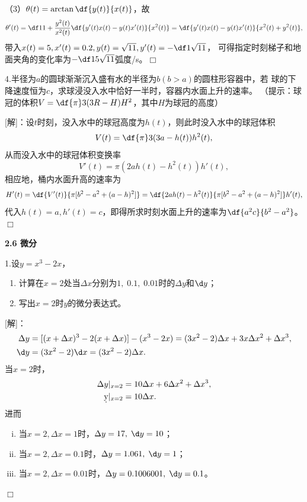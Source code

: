 （3）$\theta(t)=\arctan\df{y(t)}{x(t)}$，故
$$\theta'(t)=\df1{1+\frac{y^2(t)}{x^2(t)}}
\df{y'(t)x(t)-y(t)x'(t)}{x^2(t)}=\df{y'(t)x(t)-y(t)x'(t)}{x^2(t)+y^2(t)},$$
带入$x(t)=5,x'(t)=0.2,y(t)=\sqrt{11},y'(t)=-\df1{\sqrt{11}}$，
可得指定时刻梯子和地面夹角的变化率为$-\df1{5\sqrt{11}}$弧度/s。\hfill$\Box$

\bigskip

4.半径为$a$的圆球渐渐沉入盛有水的半径为$b(b>a)$的圆柱形容器中，若
球的下降速度恒为$c$，求球浸没入水中恰好一半时，容器内水面上升的速率。
（提示：球冠的体积$V=\df{\pi}3(3R-H)H^2$，其中$H$为球冠的高度）

[解]：设$t$时刻，没入水中的球冠高度为$h(t)$，则此时没入水中的球冠体积
$$V(t)=\df{\pi}3(3a-h(t))h^2(t),$$
从而没入水中的球冠体积变换率
$$V'(t)=\pi(2ah(t)-h^2(t))h'(t),$$
相应地，桶内水面升高的速率为
$$H'(t)=\df{V'(t)}{\pi [b^2-a^2+(a-h)^2]}
=\df{2ah(t)-h^2(t)}{\pi [b^2-a^2+(a-h)^2]}h'(t),$$
代入$h(t)=a,h'(t)=c$，即得所求时刻水面上升的速率为$\df{a^2c}{b^2-a^2}$。
\hfill$\Box$

\begin{center}
	\bf 2.6 微分
\end{center}

\bigskip

1.设$y=x^3-2x$，
\begin{enumerate}[(1)]
  \setlength{\itemindent}{1cm}
  \item 计算在$x=2$处当$\Delta x$分别为$1,\;0.1,\;
  0.01$时的$\Delta y$和$\d y$；
  \item 写出$x=2$时$y$的微分表达式。
\end{enumerate}

[解]：
\begin{align*}
	\Delta y&=[(x+\Delta x)^3-2(x+\Delta x)]-(x^3-2x)
	=(3x^2-2)\Delta x+3x\Delta x^2+\Delta x^3,\\
	\d y&=(3x^2-2)\d x=(3x^2-2)\Delta x.
\end{align*}
当$x=2$时，
\begin{align*}
	\Delta y|_{x=2}&
	=10\Delta x+6\Delta x^2+\Delta x^3,\\
	\d y|_{x=2}&=10\Delta x.
\end{align*}
进而
\begin{enumerate}[(i)]
  \item 当$x=2,\Delta x=1$时，$\Delta y=17,\;\d y=10$；
  \item 当$x=2,\Delta x=0.1$时，$\Delta y=1.061,\;\d y=1$；
  \item 当$x=2,\Delta x=0.01$时，$\Delta y=0.1006001,\;\d y=0.1$。
\end{enumerate}
\hfill$\Box$

